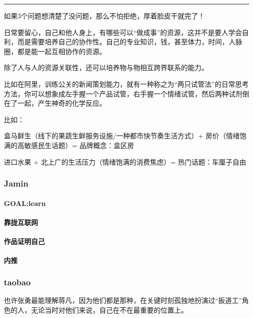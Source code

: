 \documentclass[letterpaper,11pt,english]{sphinxmanual}
\begin{document}
\bigskip\hrule\bigskip


如果3个问题想清楚了没问题，那么不怕拒绝，厚着脸皮干就完了！

日常要留心，自己和他人身上，有哪些可以“做成事”的资源，这并不是要人学会自利，而是需要培养自己的协作性。自己的专业知识，钱，甚至体力，时间，人脉圈，都是能一起互相协作的资源。

除了人与人的资源关联性，还可以培养物与物相互跨界联系的能力。

比如在阿里，训练公关的新闻策划能力，就有一种称之为“两只试管法”的日常思考方法，你可以想象成左手握一个产品试管，右手握一个情绪试管，然后两种试剂倒在了一起，产生神奇的化学反应。

比如：

盒马鲜生（线下的果蔬生鲜服务设施/一种都市快节奏生活方式）+
房价（情绪饱满的高敏感民生话题）= 品牌概念：盒区房

进口水果 + 北上广的生活压力（情绪饱满的消费焦虑）= 热门话题：车厘子自由


\subsubsection{Jamin}
\label{\detokenize{chapter_experience/Jamin:jamin}}\label{\detokenize{chapter_experience/Jamin::doc}}

\paragraph{GOAL:learn}
\label{\detokenize{chapter_experience/Jamin:goal-learn}}

\paragraph{靠拢互联网}
\label{\detokenize{chapter_experience/Jamin:id1}}

\paragraph{作品证明自己}
\label{\detokenize{chapter_experience/Jamin:id2}}

\paragraph{内推}
\label{\detokenize{chapter_experience/Jamin:id3}}

\subsubsection{taobao}
\label{\detokenize{chapter_experience/taobao:taobao}}\label{\detokenize{chapter_experience/taobao::doc}}
也许张勇最能理解蒋凡，因为他们都是那种，在关键时刻孤独地扮演过“扳道工”角色的人，无论当时对他们来说，自己在不在最重要的位置上。
\end{document}
